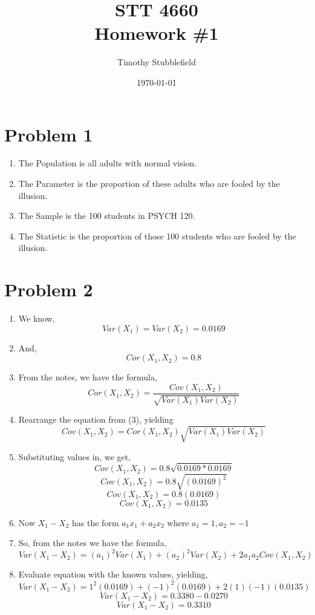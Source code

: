 \documentclass{article}
\title{STT 4660 \\ Homework \#1}
\author{Timothy Stubblefield}
\date{\today}
\begin{document}
\maketitle

\section*{Problem 1}
	\begin{enumerate}
		\item The Population is all adults with normal vision.
		\item The Parameter is the proportion of these adults who are fooled by the illusion.
		\item The Sample is the 100 students in PSYCH 120.
		\item The Statistic is the proportion of those 100 students who are fooled 
			by the illusion.
	\end{enumerate}

\section*{Problem 2}
	\begin{enumerate}
		\item  We know,
			\[Var(X_1) = Var(X_2) = 0.0169\]
		\item And,
			\[Cor(X_1,X_2) = 0.8\]
		\item From the notes, we have the formula,
			\[Cor(X_1,X_2) = \frac{Cov(X_1,X_2)}{\sqrt{Var(X_1)Var(X_2)}}\]
		\item Rearrange the equation from (3), yielding
			\[Cov(X_1,X_2) = Cor(X_1,X_2) \sqrt{Var(X_1)Var(X_2)}\]
		\item Substituting values in, we get, 
			\[ Cov(X_1,X_2) = 0.8 \sqrt{0.0169*0.0169}\]
			\[ Cov(X_1,X_2) = 0.8 \sqrt{(0.0169)^2}\]
			\[ Cov(X_1,X_2) = 0.8 (0.0169)\]
			\[ Cov(X_1,X_2) = 0.0135\]
		\item Now $X_1 - X_2$ has the form $a_1x_1 + a_2x_2$ where $a_1 = 1,a_2 = -1$
		\item So, from the notes we have the formula,
			\[Var(X_1 - X_2) = (a_1)^2Var(X_1) + (a_2)^2Var(X_2) +2a_1a_2Cov(X_1,X_2)\]
		\item Evaluate equation with the known values, yielding,
			\[Var(X_1 - X_2) =  1^2(0.0169) + (-1)^2(0.0169) + 2(1)(-1)(0.0135)\]
			\[Var(X_1 - X_2) =  0.3380 - 0.0270\]
			\[Var(X_1 - X_2) = 0.3310\] 
	\end{enumerate}
\end{document}
